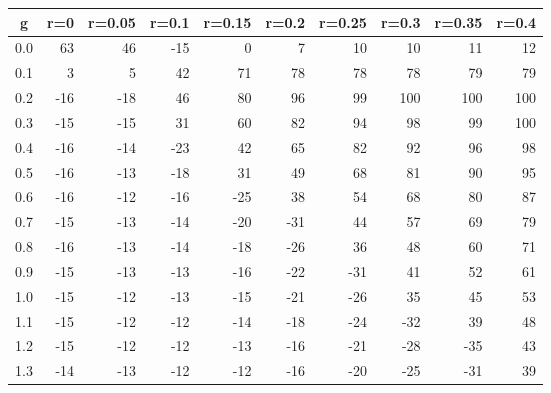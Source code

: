 %
\begin{table}[!tbp]
 \begin{center}
 \begin{tabular}{rrrrrrrrrr}\hline\hline
\multicolumn{1}{c}{g}&\multicolumn{1}{c}{r=0}&\multicolumn{1}{c}{r=0.05}&\multicolumn{1}{c}{r=0.1}&\multicolumn{1}{c}{r=0.15}&\multicolumn{1}{c}{r=0.2}&\multicolumn{1}{c}{r=0.25}&\multicolumn{1}{c}{r=0.3}&\multicolumn{1}{c}{r=0.35}&\multicolumn{1}{c}{r=0.4}\tabularnewline
\hline
0.0& 63& 46&-15&  0&  7& 10& 10& 11& 12\tabularnewline
0.1&  3&  5& 42& 71& 78& 78& 78& 79& 79\tabularnewline
0.2&-16&-18& 46& 80& 96& 99&100&100&100\tabularnewline
0.3&-15&-15& 31& 60& 82& 94& 98& 99&100\tabularnewline
0.4&-16&-14&-23& 42& 65& 82& 92& 96& 98\tabularnewline
0.5&-16&-13&-18& 31& 49& 68& 81& 90& 95\tabularnewline
0.6&-16&-12&-16&-25& 38& 54& 68& 80& 87\tabularnewline
0.7&-15&-13&-14&-20&-31& 44& 57& 69& 79\tabularnewline
0.8&-16&-13&-14&-18&-26& 36& 48& 60& 71\tabularnewline
0.9&-15&-13&-13&-16&-22&-31& 41& 52& 61\tabularnewline
1.0&-15&-12&-13&-15&-21&-26& 35& 45& 53\tabularnewline
1.1&-15&-12&-12&-14&-18&-24&-32& 39& 48\tabularnewline
1.2&-15&-12&-12&-13&-16&-21&-28&-35& 43\tabularnewline
1.3&-14&-13&-12&-12&-16&-20&-25&-31& 39\tabularnewline
\hline
\end{tabular}

\end{center}

\end{table}

